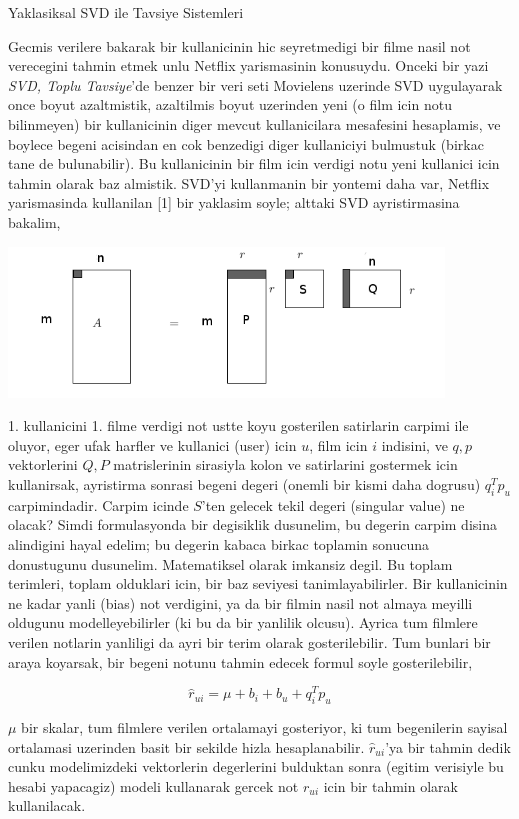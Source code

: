\documentclass[12pt,fleqn]{article}\usepackage{../common}
\begin{document}
Yaklasiksal SVD ile Tavsiye Sistemleri

Gecmis verilere bakarak bir kullanicinin hic seyretmedigi bir filme nasil
not verecegini tahmin etmek unlu Netflix yarismasinin konusuydu. Onceki bir
yazi {\em SVD, Toplu Tavsiye}'de benzer bir veri seti Movielens uzerinde
SVD uygulayarak once boyut azaltmistik, azaltilmis boyut uzerinden yeni (o
film icin notu bilinmeyen) bir kullanicinin diger mevcut kullanicilara
mesafesini hesaplamis, ve boylece begeni acisindan en cok benzedigi diger
kullaniciyi bulmustuk (birkac tane de bulunabilir). Bu kullanicinin bir
film icin verdigi notu yeni kullanici icin tahmin olarak baz
almistik. SVD'yi kullanmanin bir yontemi daha var, Netflix yarismasinda
kullanilan [1] bir yaklasim soyle; alttaki SVD ayristirmasina bakalim,

\includegraphics[height=4cm]{svdapprox_1.png}

1. kullanicini 1. filme verdigi not ustte koyu gosterilen satirlarin
carpimi ile oluyor, eger ufak harfler ve kullanici (user) icin $u$, film
icin $i$ indisini, ve $q,p$ vektorlerini $Q,P$ matrislerinin sirasiyla
kolon ve satirlarini gostermek icin kullanirsak, ayristirma sonrasi begeni
degeri (onemli bir kismi daha dogrusu) $q_i^Tp_u$ carpimindadir. Carpim
icinde $S$'ten gelecek tekil degeri (singular value) ne olacak?  Simdi
formulasyonda bir degisiklik dusunelim, bu degerin carpim disina alindigini
hayal edelim; bu degerin kabaca birkac toplamin sonucuna donustugunu
dusunelim. Matematiksel olarak imkansiz degil. Bu toplam terimleri, toplam
olduklari icin, bir baz seviyesi tanimlayabilirler. Bir kullanicinin ne
kadar yanli (bias) not verdigini, ya da bir filmin nasil not almaya meyilli
oldugunu modelleyebilirler (ki bu da bir yanlilik olcusu). Ayrica tum
filmlere verilen notlarin yanliligi da ayri bir terim olarak
gosterilebilir. Tum bunlari bir araya koyarsak, bir begeni notunu tahmin
edecek formul soyle gosterilebilir,

$$
\hat{r}_{ui} = \mu + b_i + b_u + q_i^Tp_u
$$

$\mu$ bir skalar, tum filmlere verilen ortalamayi gosteriyor, ki tum
begenilerin sayisal ortalamasi uzerinden basit bir sekilde hizla
hesaplanabilir. $\hat{r}_{ui}$'ya bir tahmin dedik cunku modelimizdeki
vektorlerin degerlerini bulduktan sonra (egitim verisiyle bu hesabi
yapacagiz) modeli kullanarak gercek not $r_{ui}$ icin bir
tahmin olarak kullanilacak.
\end{document}
